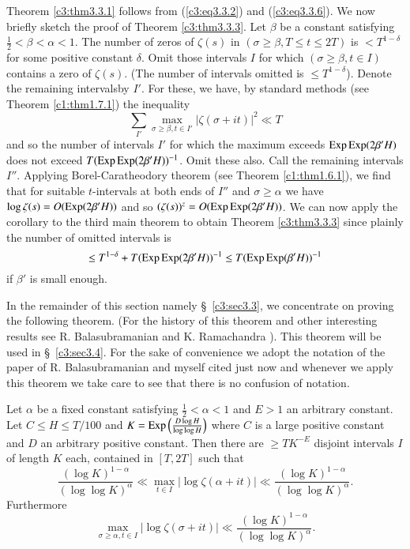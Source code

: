 Theorem \ref{c3:thm3.3.1} follows from (\ref{c3:eq3.3.2}) and (\ref{c3:eq3.3.6}). We now briefly sketch the proof of Theorem \ref{c3:thm3.3.3}. Let $\beta$ be a constant satisfying $\frac{1}{2} < \beta < \alpha <1$. The number of zeros of $\zeta(s)$ in $(\sigma \geq \beta, T \leq t \leq 2T)$ is $< T^{1-\delta}$ for some positive constant $\delta$. Omit those intervals $I$ for which $(\sigma \geq \beta, t \in I)$ contains a zero of $\zeta(s)$. (The number of intervals omitted is $\leq T^{1-\delta}$). Denote the remaining intervals\pageoriginale by $I'$. For these, we have, by standard methods (see Theorem \ref{c1:thm1.7.1}) the inequality
$$
\sum\limits_{I'} \max\limits_{\sigma \geq \beta, t \in I'} |\zeta(\sigma + it)|^2 \ll T
$$
and so the number of intervals $I'$ for which the maximum exceeds $\Exp\break\Exp (2\beta' H)$ does not exceed $T(\operatorname{Exp}\operatorname{Exp} (2\beta' H))^{-1}$. Omit these also. Call the remaining intervals $I''$. Applying Borel-Caratheodory theorem (see Theorem \ref{c1:thm1.6.1}), we find that for suitable $t$-intervals at both ends of $I''$ and $\sigma \geq \alpha$ we have $\log \zeta(s) = O (\operatorname{Exp} (2\beta' H))$ and so $(\zeta(s))^z= O(\operatorname{Exp} \operatorname{Exp} (2\beta' H))$. We can now apply the corollary to the third main theorem to obtain Theorem \ref{c3:thm3.3.3} since plainly the number of omitted intervals is
$$
\leq T^{1-\delta} + T(\operatorname{Exp} \operatorname{Exp} (2\beta' H))^{-1} \leq T (\operatorname{Exp} \operatorname{Exp} (\beta'H))^{-1}
$$
if $\beta'$ is small enough.

In the remainder of this section namely \S\ \ref{c3:sec3.3}, we concentrate on proving the following theorem. (For the history of this theorem and other interesting results see R. Balasubramanian and K. Ramachandra \cite{Balasubramanian and Ramachandra7}). This theorem will be used in \S\ \ref{c3:sec3.4}. For the sake of convenience we adopt the notation of the paper of R. Balasubramanian and myself cited just now and whenever we apply this theorem we take care to see that there is no confusion of notation.

\begin{theorem}\label{c3:thm3.3.4}
Let $\alpha$ be a fixed constant satisfying $\frac{1}{2} < \alpha < 1$ and $E >1$ an arbitrary constant. Let $C \leq H \leq T/100$ and $K = \operatorname{Exp} \left(\frac{D\log H}{\log \log H} \right)$ where $C$ is a large positive constant and $D$ an arbitrary positive constant. Then there are $\geq T K^{-E}$ disjoint intervals $I$ of length $K$ each, contained in $[T, 2 T]$ such that 
$$
\frac{(\log K)^{1-\alpha}}{(\log \log K)^\alpha} \ll \max\limits_{t \in I}|\log \zeta(\alpha + it)| \ll \frac{(\log K)^{1-\alpha}}{(\log \log K)^{\alpha}}.
$$
Furthermore
$$
\max\limits_{\sigma \geq \alpha, t \in I} |\log \zeta(\sigma + it)| \ll \frac{(\log K)^{1-\alpha}}{(\log\log K)^{\alpha}}.
$$
 \end{theorem}

